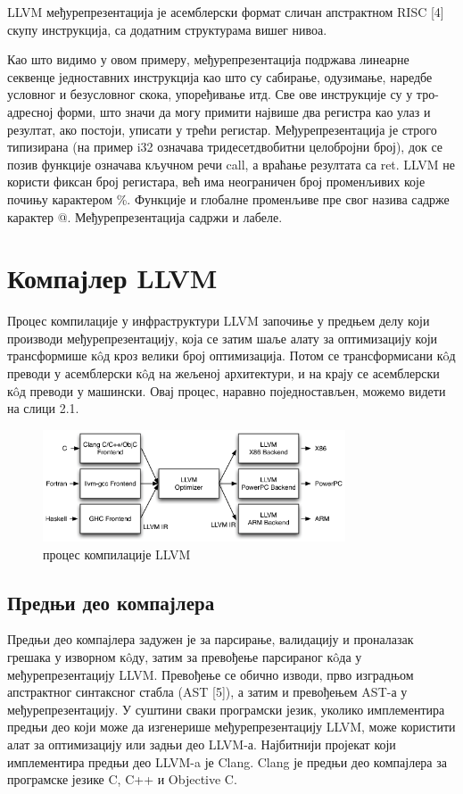 \documentclass[12pt,oneside]{memoir}
\begin{document}
LLVM међурепрезентација је асемблерски формат сличан апстрактном RISC [4] скупу
инструкција, са додатним структурама вишег нивоа.

Као што видимо у овом примеру, међурепрезентација подржава линеарне секвенце
једноставних инструкција као што су сабирање, одузимање, наредбе условног и безусловног
 скока, упоређивање итд.
Све ове инструкције су у тро-адресној форми, што значи да могу примити највише два регистра 
као улаз и резултат, ако постоји, уписати у трећи регистар.
Међурепрезентација је строго типизирана (на пример i32 означава тридесетдвобитни
целобројни број), док се позив функције означава кључном речи call, а враћање
резултата са ret.
LLVM не користи фиксан број регистара, већ има неограничен број променљивих које
почињу карактером \%. 
Функције и глобалне променљиве пре свог назива садрже карактер @.
Међурепрезентација садржи и лабеле.

\section{Компајлер LLVM}  

Процес компилације у инфраструктури LLVM започиње у предњем  делу који производи
међурепрезентацију, која се затим шаље алату за оптимизацију који трансформише
к\^{o}д кроз велики број оптимизација.
Потом се трансформисани к\^{o}д преводи у асемблерски к\^{o}д на жељеној архитектури, 
и на крају се асемблерски к\^{o}д преводи у машински. 
Овај процес, наравно поједностављен, можемо видети на слици 2.1. 

\begin{figure}[!ht]
  \centering
  \includegraphics[width=0.8\textwidth]{LLVMCompiler1.png}
  \caption{процес компилације LLVM}
  \label{fig:grafikon}
\end{figure}

\subsection{Предњи део компајлера}
 Предњи део компајлера задужен је за парсирање, валидацију и проналазак грешака у изворном
 к\^{o}ду, затим за превођење парсираног к\^{o}да у међурепрезентацију LLVM.
 Превођење се обично изводи, прво изградњом апстрактног синтаксног стабла (AST [5]), а затим  и превођењем AST-а у међурепрезентацију.
 У суштини сваки програмски језик, уколико имплементира предњи део који може да
 изгенерише међурепрезентацију LLVM, може користити алат за оптимизацију или 
 задњи део LLVM-а.
 Најбитнији пројекат који имплементира предњи део LLVM-a је Clang.
 Clang је предњи део компајлера за програмске језике  C, C++ и Objective C.
\end{document}
